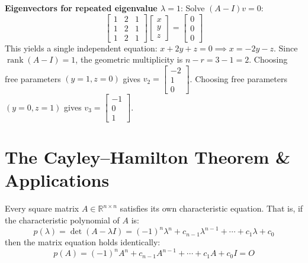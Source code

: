 \begin{solutionbox}
\textbf{Eigenvectors for repeated eigenvalue $\lambda = 1$}:
Solve $(A - I) v = 0$:
\begin{equation}
\begin{bmatrix}
1 & 2 & 1 \\
1 & 2 & 1 \\
1 & 2 & 1
\end{bmatrix} \begin{bmatrix} x \\ y \\ z \end{bmatrix} = \begin{bmatrix} 0 \\ 0 \\ 0 \end{bmatrix}
\end{equation}
This yields a single independent equation: $x + 2y + z = 0 \implies x = -2y - z$.
Since $\operatorname{rank}(A-I) = 1$, the geometric multiplicity is $n - r = 3 - 1 = 2$.
Choosing free parameters $(y=1, z=0)$ gives $v_2 = \begin{bmatrix} -2 \\ 1 \\ 0 \end{bmatrix}$.
Choosing free parameters $(y=0, z=1)$ gives $v_3 = \begin{bmatrix} -1 \\ 0 \\ 1 \end{bmatrix}$.
\end{solutionbox}

\section{The Cayley--Hamilton Theorem \& Applications}

\begin{theorem}
Every square matrix $A \in \mathbb{R}^{n\times n}$ satisfies its own characteristic equation. That is, if the characteristic polynomial of $A$ is:
\begin{equation}
p(\lambda) = \det(A - \lambda I) = (-1)^n \lambda^n + c_{n-1} \lambda^{n-1} + \cdots + c_1 \lambda + c_0
\end{equation}
then the matrix equation holds identically:
\begin{equation}
p(A) = (-1)^n A^n + c_{n-1} A^{n-1} + \cdots + c_1 A + c_0 I = O
\end{equation}
\end{theorem}

